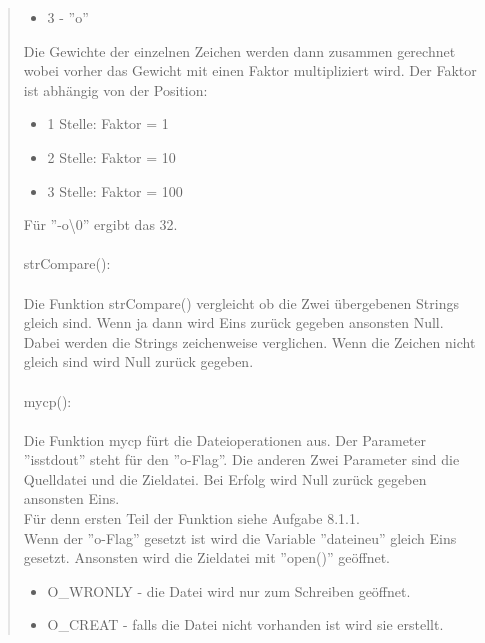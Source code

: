 \begin{quote}
\begin{itemize}
				\item 3 - ''o''\\
			\end{itemize}
			Die Gewichte der einzelnen Zeichen werden dann zusammen gerechnet wobei vorher das Gewicht mit einen Faktor multipliziert wird. Der Faktor ist abh\"angig von der Position:\\
			\begin{itemize}
				\item 1 Stelle: Faktor =   1\\
				\item 2 Stelle: Faktor =  10\\
				\item 3 Stelle: Faktor = 100\\
			\end{itemize}
			F\"ur ''-o\textbackslash 0'' ergibt das 32.\\ \\
			strCompare():\\ \\
			\small
			\normalsize Die Funktion strCompare() vergleicht ob die Zwei \"ubergebenen Strings gleich sind. Wenn ja dann wird Eins zur\"uck gegeben ansonsten Null.\\
			Dabei werden die Strings zeichenweise verglichen. Wenn die Zeichen nicht gleich sind wird Null zur\"uck gegeben.\\ \\
			mycp():\\ \\
			Die Funktion mycp f\"urt die Dateioperationen aus. Der Parameter ''isstdout'' steht f\"ur den ''o-Flag''. Die anderen Zwei Parameter sind die Quelldatei und die Zieldatei. Bei Erfolg wird Null zur\"uck gegeben ansonsten Eins.\\
			F\"ur denn ersten Teil der Funktion siehe Aufgabe 8.1.1.\\
			\small
			\normalsize Wenn der ''o-Flag'' gesetzt ist wird die Variable ''dateineu'' gleich Eins gesetzt. Ansonsten wird die Zieldatei mit ''open()'' ge\"offnet.\\
			\begin{itemize}
				\item O\_WRONLY - die Datei wird nur zum Schreiben ge\"offnet.\\
				\item O\_CREAT - falls die Datei nicht vorhanden ist wird sie erstellt.\\

\end{itemize}
\end{quote}
